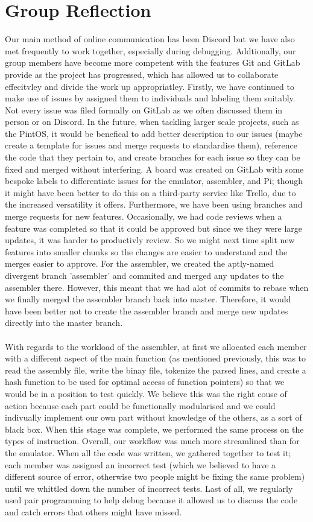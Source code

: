 \documentclass[11pt]{article}
\begin{document}
\pagebreak
\section{Group Reflection}
Our main method of online communication has been Discord but we have also met frequently to work together, especially during debugging. Addtionally, our group members have become more competent with the features Git and GitLab provide as the project has progressed, which has allowed us to collaborate effecitvley and divide the work up appropriatley. Firstly, we have continued to make use of issues by assigned them to individuals and labeling them suitably. Not every issue was filed formally on GitLab as we often discussed them in person or on Discord. In the future, when tackling larger scale projects, such as the PintOS, it would be benefical to add better description to our issues (maybe create a template for issues and merge requests to standardise them), reference the code that they pertain to, and create branches for each issue so they can be fixed and merged without interfering. A board was created on GitLab with some bespoke labels to differentiate issues for the emulator, assembler, and Pi; though it might have been better to do this on a third-party service like Trello, due to the increased versatility it offers. Furthermore, we have been using branches and merge requests for new features. Occasionally, we had code reviews when a feature was completed so that it could be approved but since we they were large updates, it was harder to productivly review. So we might next time split new features into smaller chunks so the changes are easier to understand and the merges easier to approve. For the assembler, we created the aptly-named divergent branch 'assembler' and commited and merged any updates to the assembler there. However, this meant that we had alot of commits to rebase when we finally merged the assembler branch back into master. Therefore, it would have been better not to create the assembler branch and merge new updates directly into the master branch. \\\\
With regards to the workload of the assembler, at first we allocated each member with a different aspect of the main function (as mentioned previously, this was to read the assembly file, write the binay file, tokenize the parsed lines, and create a hash function to be used for optimal access of function pointers) so that we would be in a position to test quickly. We believe this was the right couse of action because  each part could be functionally modularised and we could indivually implement our own part without knowledge of the others, as a sort of black box. When this stage was complete, we performed the same process on the types of instruction. Overall, our workflow was much more streamlined than for the emulator. When all the code was written, we gathered together to test it; each member was assigned an incorrect test (which we believed to have a different source of error, otherwise two people might be fixing the same problem) until we whittled down the number of incorrect tests. Last of all, we regularly used pair programming to help debug because it allowed us to discuss the code and catch errors that others might have missed.  \\
\end{document}
